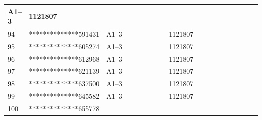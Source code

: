 \documentclass[UTF8,10pt,a4paper,fontset=fandol]{ctexart}
\newcommand{\fieldvalue}[1]{#1}
\begin{document}
\begin{center}
\begin{tabular}{|p{0.08\linewidth}|p{0.30\linewidth}|p{0.25\linewidth}|p{0.22\linewidth}|p{0.15\linewidth}|}
\fieldvalue{A1--3}
&
\fieldvalue{1121807}
& \\ \hline
\fieldvalue{94}
&
\fieldvalue{**************591431}
&
\fieldvalue{A1--3}
&
\fieldvalue{1121807}
& \\ \hline
\fieldvalue{95}
&
\fieldvalue{**************605274}
&
\fieldvalue{A1--3}
&
\fieldvalue{1121807}
& \\ \hline
\fieldvalue{96}
&
\fieldvalue{**************612968}
&
\fieldvalue{A1--3}
&
\fieldvalue{1121807}
& \\ \hline
\fieldvalue{97}
&
\fieldvalue{**************621139}
&
\fieldvalue{A1--3}
&
\fieldvalue{1121807}
& \\ \hline
\fieldvalue{98}
&
\fieldvalue{**************637500}
&
\fieldvalue{A1--3}
&
\fieldvalue{1121807}
& \\ \hline
\fieldvalue{99}
&
\fieldvalue{**************645582}
&
\fieldvalue{A1--3}
&
\fieldvalue{1121807}
& \\ \hline
\fieldvalue{100}
&
\fieldvalue{**************655778}
&

\end{tabular}
\end{center}
\end{document}
